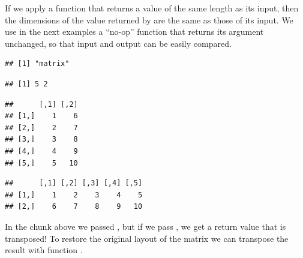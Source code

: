 \documentclass[krantz2]{krantz}\usepackage{knitr}%
\begin{document}
\begin{explainbox}
If we apply a function that returns a value of the same length as its input, then the dimensions of the value returned by  are the same as those of its input. We use in the next examples a ``no-op'' function that returns its argument unchanged, so that input and output can be easily compared.

\begin{knitrout}\footnotesize
{}\color{fgcolor}\begin{kframe}
\begin{alltt}
\hlstd{(}\hlstd{)}
 \hlkwb{<-} \hlstd{(}\hlopt{:}\hlstd{,}  \hlstd{=} \hlstd{)}
 \hlkwb{<-} \hlstd{(}
 \hlkwb{<-} \hlstd{(}   \hlstd{=} \hlstd{,}  
\end{alltt}
\begin{verbatim}
## [1] "matrix"
\end{verbatim}
\begin{alltt}
\end{alltt}
\begin{verbatim}
## [1] 5 2
\end{verbatim}
\begin{alltt}
\end{alltt}
\begin{verbatim}
##      [,1] [,2]
## [1,]    1    6
## [2,]    2    7
## [3,]    3    8
## [4,]    4    9
## [5,]    5   10
\end{verbatim}
\begin{alltt}
\end{alltt}
\begin{verbatim}
##      [,1] [,2] [,3] [,4] [,5]
## [1,]    1    2    3    4    5
## [2,]    6    7    8    9   10
\end{verbatim}
\end{kframe}
\end{knitrout}

In the chunk above we passed , but if we pass , we get a return value that is transposed! To restore the original layout of the matrix we can transpose the result with function .


\end{explainbox}
\end{document}
